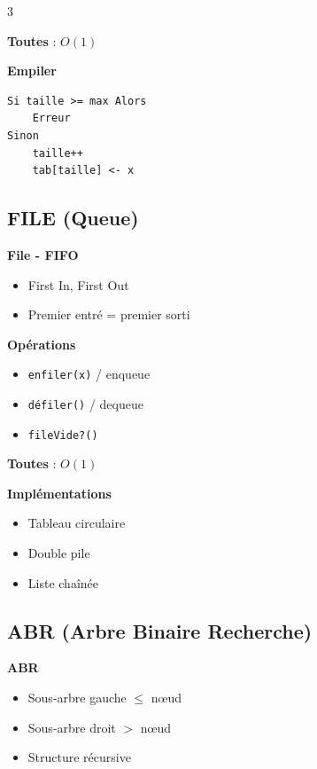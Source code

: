 \documentclass[10pt,a4paper,landscape]{article}
\begin{document}
\begin{multicols}{3}
\begin{complexbox}
\textbf{Toutes} : $O(1)$
\end{complexbox}

\begin{algobox}
\small
\textbf{Empiler}
\begin{verbatim}
Si taille >= max Alors
    Erreur
Sinon
    taille++
    tab[taille] <- x
\end{verbatim}
\end{algobox}

\subsection*{FILE (Queue)}

\begin{defbox}
\textbf{File - FIFO}
\begin{itemize}
\item First In, First Out
\item Premier entré = premier sorti
\end{itemize}
\end{defbox}

\begin{algobox}
\textbf{Opérations}
\begin{itemize}
\item \texttt{enfiler(x)} / enqueue
\item \texttt{défiler()} / dequeue
\item \texttt{fileVide?()}
\end{itemize}
\end{algobox}

\begin{complexbox}
\textbf{Toutes} : $O(1)$
\end{complexbox}

\begin{importbox}
\textbf{Implémentations}
\begin{itemize}
\item Tableau circulaire
\item Double pile
\item Liste chaînée
\end{itemize}
\end{importbox}

\subsection*{ABR (Arbre Binaire Recherche)}

\begin{defbox}
\textbf{ABR}
\begin{itemize}
\item Sous-arbre gauche $\leq$ nœud
\item Sous-arbre droit $>$ nœud
\item Structure récursive
\end{itemize}
\end{defbox}


\end{multicols}
\end{document}
